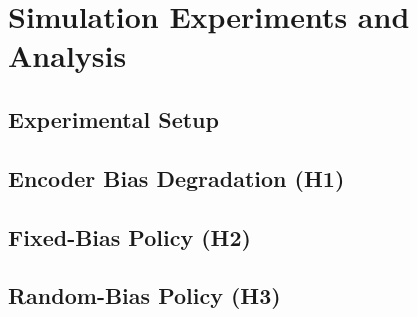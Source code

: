 
\chapter{Simulation Experiments and Analysis}\label{ch:experiments}

\section{Experimental Setup}\label{sec:exp_setup}


\section{Encoder Bias Degradation (H1)}\label{sec:exp_h1}

%
%
%

\section{Fixed-Bias Policy (H2)}\label{sec:exp_h2}

%
%
%

\section{Random-Bias Policy (H3)}\label{sec:exp_h3}

